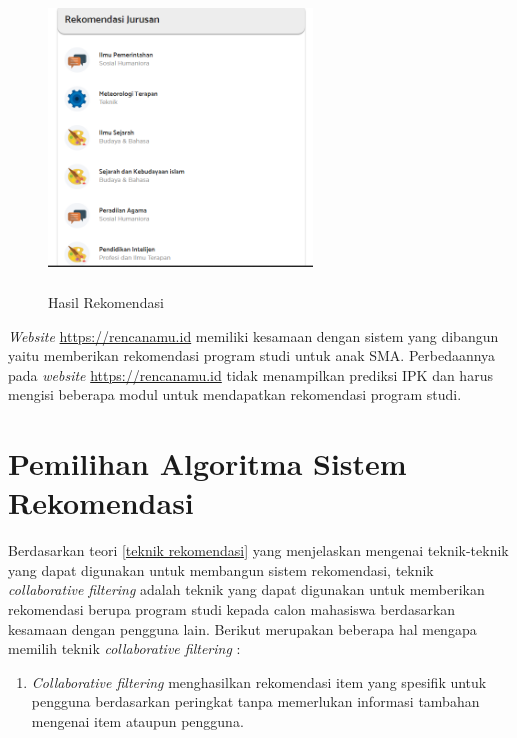 \begin{enumerate}
    \begin{figure}[H]
        \centering
        \includegraphics[width = 7cm, height = 8cm ]{doc/DokumenSkripsi/Gambar/gambar36.PNG}
        \caption{Hasil Rekomendasi}
        \label{gambar36}
    \end{figure}
    
\end{enumerate}

\textit{Website} \url{https://rencanamu.id} memiliki kesamaan dengan sistem yang dibangun yaitu memberikan rekomendasi program studi untuk anak SMA. Perbedaannya pada \textit{website} \url{https://rencanamu.id} tidak menampilkan prediksi IPK dan harus mengisi beberapa modul untuk mendapatkan rekomendasi program studi. 

\section{Pemilihan Algoritma Sistem Rekomendasi}
Berdasarkan teori \ref{teknik rekomendasi} yang menjelaskan mengenai teknik-teknik yang dapat digunakan untuk membangun sistem rekomendasi, teknik \textit{collaborative filtering} adalah teknik yang dapat digunakan untuk memberikan rekomendasi berupa program studi kepada calon mahasiswa berdasarkan kesamaan dengan pengguna lain. Berikut merupakan beberapa hal mengapa memilih teknik \textit{collaborative filtering} :

\begin{enumerate}
    \item \textit{Collaborative filtering} menghasilkan rekomendasi item yang spesifik untuk pengguna berdasarkan peringkat tanpa memerlukan informasi tambahan mengenai item ataupun pengguna.
    
\end{enumerate}

